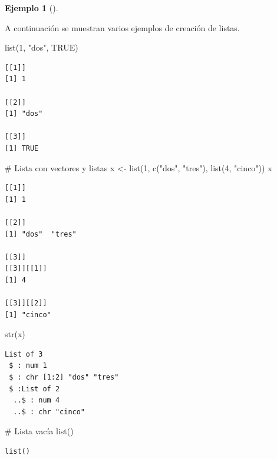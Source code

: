 \documentclass[
  a4paper,
]{scrreport}
\newenvironment{Shaded}{\begin{snugshade}}{\end{snugshade}}
\newcommand{\CommentTok}[1]{\textcolor[rgb]{0.37,0.37,0.37}{#1}}
\newcommand{\ConstantTok}[1]{\textcolor[rgb]{0.56,0.35,0.01}{#1}}
\newcommand{\DecValTok}[1]{\textcolor[rgb]{0.68,0.00,0.00}{#1}}
\newcommand{\FunctionTok}[1]{\textcolor[rgb]{0.28,0.35,0.67}{#1}}
\newcommand{\NormalTok}[1]{\textcolor[rgb]{0.00,0.23,0.31}{#1}}
\newcommand{\OtherTok}[1]{\textcolor[rgb]{0.00,0.23,0.31}{#1}}
\newcommand{\StringTok}[1]{\textcolor[rgb]{0.13,0.47,0.30}{#1}}
\theoremstyle{definition}
\theoremstyle{definition}
\newtheorem{example}{Ejemplo}[chapter]
\theoremstyle{remark}
\begin{document}
\leavevmode{}%
\begin{example}[]\label{exm-creacion-listas}

A continuación se muestran varios ejemplos de creación de listas.

\begin{Shaded}
\begin{Highlighting}[]
\FunctionTok{list}\NormalTok{(}\DecValTok{1}\NormalTok{, }\StringTok{"dos"}\NormalTok{, }\ConstantTok{TRUE}\NormalTok{)}
\end{Highlighting}
\end{Shaded}

\begin{verbatim}
[[1]]
[1] 1

[[2]]
[1] "dos"

[[3]]
[1] TRUE
\end{verbatim}

\begin{Shaded}
\begin{Highlighting}[]
\CommentTok{\# Lista con vectores y listas}
\NormalTok{x }\OtherTok{\textless{}{-}} \FunctionTok{list}\NormalTok{(}\DecValTok{1}\NormalTok{, }\FunctionTok{c}\NormalTok{(}\StringTok{"dos"}\NormalTok{, }\StringTok{"tres"}\NormalTok{), }\FunctionTok{list}\NormalTok{(}\DecValTok{4}\NormalTok{, }\StringTok{"cinco"}\NormalTok{))}
\NormalTok{x}
\end{Highlighting}
\end{Shaded}

\begin{verbatim}
[[1]]
[1] 1

[[2]]
[1] "dos"  "tres"

[[3]]
[[3]][[1]]
[1] 4

[[3]][[2]]
[1] "cinco"
\end{verbatim}

\begin{Shaded}
\begin{Highlighting}[]
\FunctionTok{str}\NormalTok{(x)}
\end{Highlighting}
\end{Shaded}

\begin{verbatim}
List of 3
 $ : num 1
 $ : chr [1:2] "dos" "tres"
 $ :List of 2
  ..$ : num 4
  ..$ : chr "cinco"
\end{verbatim}

\begin{Shaded}
\begin{Highlighting}[]
\CommentTok{\# Lista vacía}
\FunctionTok{list}\NormalTok{()}
\end{Highlighting}
\end{Shaded}

\begin{verbatim}
list()
\end{verbatim}

\end{example}
\end{document}
